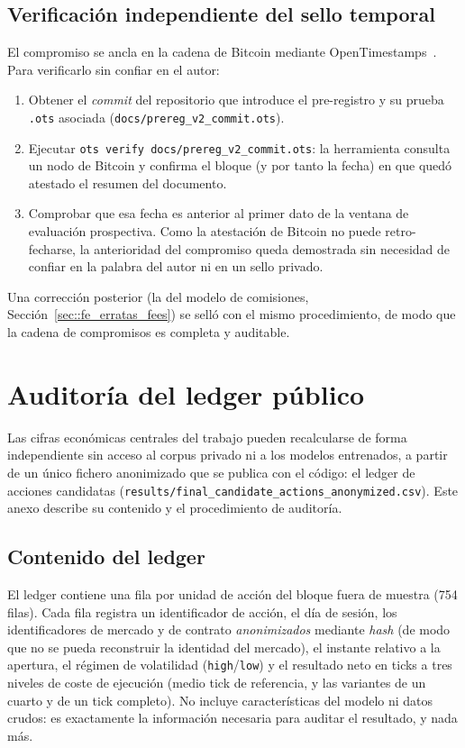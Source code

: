 \section*{Verificación independiente del sello temporal}

El compromiso se ancla en la cadena de Bitcoin mediante
OpenTimestamps~\cite{opentimestamps}. Para verificarlo sin confiar en el autor:

\begin{enumerate}[noitemsep]
\item Obtener el \emph{commit} del repositorio que introduce el pre-registro y su prueba
\texttt{.ots} asociada (\texttt{docs/prereg\_v2\_commit.ots}).
\item Ejecutar \texttt{ots verify docs/prereg\_v2\_commit.ots}: la herramienta consulta
un nodo de Bitcoin y confirma el bloque (y por tanto la fecha) en que quedó atestado el
resumen del documento.
\item Comprobar que esa fecha es anterior al primer dato de la ventana de evaluación
prospectiva. Como la atestación de Bitcoin no puede retro-fecharse, la anterioridad del
compromiso queda demostrada sin necesidad de confiar en la palabra del autor ni en un
sello privado.
\end{enumerate}

Una corrección posterior (la del modelo de comisiones,
Sección~\ref{sec::fe_erratas_fees}) se selló con el mismo procedimiento, de modo que la
cadena de compromisos es completa y auditable.

\chapter{Auditoría del ledger público}
\label{anexo:ledger}

Las cifras económicas centrales del trabajo pueden recalcularse de forma independiente sin
acceso al corpus privado ni a los modelos entrenados, a partir de un único fichero
anonimizado que se publica con el código: el ledger de acciones candidatas
(\texttt{results/\allowbreak final\_candidate\_\allowbreak actions\_\allowbreak anonymized.csv}). Este anexo describe su
contenido y el procedimiento de auditoría.

\section*{Contenido del ledger}

El ledger contiene una fila por unidad de acción del bloque fuera de muestra (754 filas).
Cada fila registra un identificador de acción, el día de sesión, los identificadores de
mercado y de contrato \emph{anonimizados} mediante \emph{hash} (de modo que no se pueda
reconstruir la identidad del mercado), el instante relativo a la apertura, el régimen de
volatilidad (\texttt{high}/\texttt{low}) y el resultado neto en ticks a tres niveles de
coste de ejecución (medio tick de referencia, y las variantes de un cuarto y de un tick
completo). No incluye características del modelo ni datos crudos: es exactamente la
información necesaria para auditar el resultado, y nada más.

